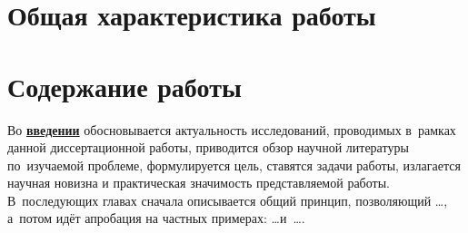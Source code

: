 \section*{Общая характеристика работы}

\newcommand{\actuality}{\pdfbookmark[1]{Актуальность}{actuality}\underline{\textbf{\actualityTXT}}}
\newcommand{\progress}{\pdfbookmark[1]{Разработанность темы}{progress}\underline{\textbf{\progressTXT}}}
\newcommand{\aim}{\pdfbookmark[1]{Цели}{aim}\underline{{\textbf\aimTXT}}}
\newcommand{\tasks}{\pdfbookmark[1]{Задачи}{tasks}\underline{\textbf{\tasksTXT}}}
\newcommand{\aimtasks}{\pdfbookmark[1]{Цели и задачи}{aimtasks}\aimtasksTXT}
\newcommand{\novelty}{\pdfbookmark[1]{Научная новизна}{novelty}\underline{\textbf{\noveltyTXT}}}
\newcommand{\influence}{\pdfbookmark[1]{Практическая значимость}{influence}\underline{\textbf{\influenceTXT}}}
\newcommand{\methods}{\pdfbookmark[1]{Методология и методы исследования}{methods}\underline{\textbf{\methodsTXT}}}
\newcommand{\defpositions}{\pdfbookmark[1]{Положения, выносимые на защиту}{defpositions}\underline{\textbf{\defpositionsTXT}}}
\newcommand{\reliability}{\pdfbookmark[1]{Достоверность}{reliability}\underline{\textbf{\reliabilityTXT}}}
\newcommand{\probation}{\pdfbookmark[1]{Апробация}{probation}\underline{\textbf{\probationTXT}}}
\newcommand{\contribution}{\pdfbookmark[1]{Личный вклад}{contribution}\underline{\textbf{\contributionTXT}}}
\newcommand{\publications}{\pdfbookmark[1]{Публикации}{publications}\underline{\textbf{\publicationsTXT}}}




\section*{Содержание работы}
Во \underline{\textbf{введении}} обосновывается актуальность
исследований, проводимых в~рамках данной диссертационной работы,
приводится обзор научной литературы по~изучаемой проблеме,
формулируется цель, ставятся задачи работы, излагается научная новизна
и практическая значимость представляемой работы. В~последующих главах
сначала описывается общий принцип, позволяющий \dots, а~потом идёт
апробация на частных примерах: \dots  и~\dots.


